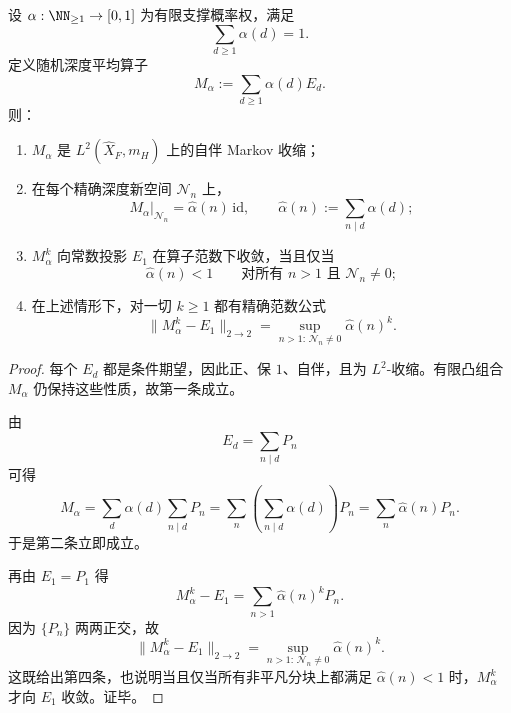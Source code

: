 \begin{theorem}[随机深度平均的完全谱刻画与精确混合判据]\label{thm:conclusion-fibadic-random-depth-average-spectral-criterion}
设 \(\alpha:\NN_{\ge 1}\to[0,1]\) 为有限支撑概率权，满足
\[
\sum_{d\ge 1}\alpha(d)=1.
\]
定义随机深度平均算子
\[
M_\alpha:=\sum_{d\ge 1}\alpha(d)E_d.
\]
则：
\begin{enumerate}
  \item \(M_\alpha\) 是 \(L^2(\widehat X_F,m_H)\) 上的自伴 Markov 收缩；
  \item 在每个精确深度新空间 \(\mathcal N_n\) 上，
  \[
  M_\alpha|_{\mathcal N_n}=\widehat\alpha(n)\,\mathrm{id},
  \qquad
  \widehat\alpha(n):=\sum_{n\mid d}\alpha(d);
  \]
  \item \(M_\alpha^k\) 向常数投影 \(E_1\) 在算子范数下收敛，当且仅当
  \[
  \widehat\alpha(n)<1
  \qquad
  \text{对所有 }n>1\text{ 且 }\mathcal N_n\neq 0;
  \]
  \item 在上述情形下，对一切 \(k\ge 1\) 都有精确范数公式
  \[
  \|M_\alpha^k-E_1\|_{2\to 2}
  =
  \sup_{n>1:\,\mathcal N_n\neq 0}\widehat\alpha(n)^k.
  \]
\end{enumerate}
\end{theorem}
\begin{proof}
每个 \(E_d\) 都是条件期望，因此正、保 \(1\)、自伴，且为 \(L^2\)-收缩。有限凸组合 \(M_\alpha\) 仍保持这些性质，故第一条成立。

由
\[
E_d=\sum_{n\mid d}P_n
\]
可得
\[
M_\alpha
=
\sum_d\alpha(d)\sum_{n\mid d}P_n
=
\sum_n\left(\sum_{n\mid d}\alpha(d)\right)P_n
=
\sum_n\widehat\alpha(n)P_n.
\]
于是第二条立即成立。

再由 \(E_1=P_1\) 得
\[
M_\alpha^k-E_1=\sum_{n>1}\widehat\alpha(n)^kP_n.
\]
因为 \(\{P_n\}\) 两两正交，故
\[
\|M_\alpha^k-E_1\|_{2\to 2}
=
\sup_{n>1:\,\mathcal N_n\neq 0}\widehat\alpha(n)^k.
\]
这既给出第四条，也说明当且仅当所有非平凡分块上都满足 \(\widehat\alpha(n)<1\) 时，\(M_\alpha^k\) 才向 \(E_1\) 收敛。证毕。
\end{proof}

